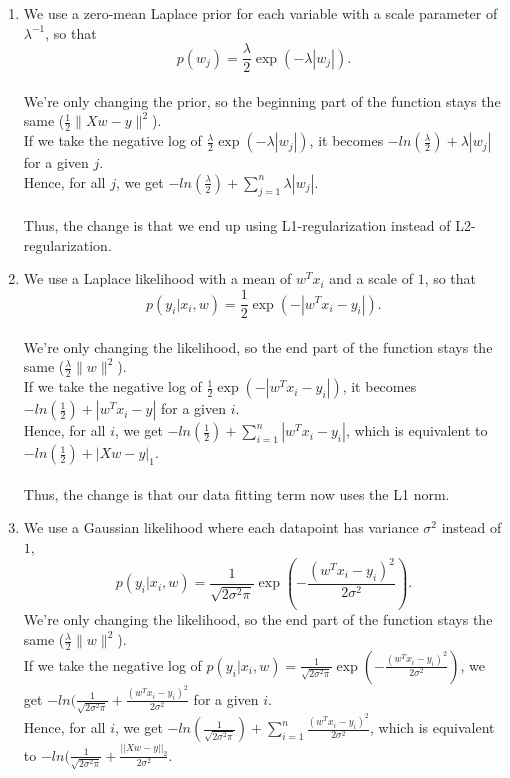 \documentclass{article}
\def\gre#1{{\color{gre}#1}}
\def\norm#1{\|#1\|}
\def\enum#1{\begin{enumerate}#1\end{enumerate}}
\begin{document}
\enum{
\item We use a zero-mean Laplace prior for each variable with a scale parameter of $\lambda^{-1}$, so that
\[
p(w_j) = \frac{\lambda}{2}\exp(-\lambda|w_j|).
\]\\
\gre{
We're only changing the prior, so the beginning part of the function stays the same ($\frac{1}{2}\norm{Xw - y}^2$).
\\
If we take the negative log of $\frac{\lambda}{2}\exp(-\lambda|w_j|)$, it becomes $-ln(\frac{\lambda}{2}) + \lambda|w_j|$ for a given $j$.
\\
Hence, for all $j$, we get $-ln(\frac{\lambda}{2}) + \sum_{j=1}^{n}λ|w_j|$.
\\\\
Thus, the change is that we end up using L1-regularization instead of L2-regularization.
}
\item We use a Laplace likelihood with a mean of $w^Tx_i$ and a scale of $1$, so that
\[
p(y_i | x_i, w) = \frac 1 2 \exp(-|w^Tx_i - y_i|).
\]\\
\gre{
We're only changing the likelihood, so the end part of the function stays the same ($\frac \lambda 2 \norm{w}^2$).
\\
If we take the negative log of $\frac 1 2 \exp(-|w^Tx_i - y_i|)$, it becomes $-ln(\frac{1}{2}) + |w^Tx_i - y|$ for a given $i$.
\\
Hence, for all $i$, we get $-ln(\frac{1}{2}) + \sum_{i=1}^{n}|w^Tx_i - y_i|$, which is equivalent to $-ln(\frac{1}{2}) + |Xw - y|_1$.
\\\\
Thus, the change is that our data fitting term now uses the L1 norm.
}
\item We use a Gaussian likelihood where each datapoint has variance $\sigma^2$ instead of $1$,
\[
p(y_i | x_i,w) = \frac{1}{\sqrt{2\sigma^2\pi}}\exp\left(-\frac{(w^Tx_i - y_i)^2}{2\sigma^2}\right).
\]
\gre{
We're only changing the likelihood, so the end part of the function stays the same ($\frac \lambda 2 \norm{w}^2$).
\\
If we take the negative log of $p(y_i | x_i,w) = \frac{1}{\sqrt{2\sigma^2\pi}}\exp\left(-\frac{(w^Tx_i - y_i)^2}{2\sigma^2}\right)$, we get $-ln(\frac{1}{\sqrt{2\sigma^2\pi}} + \frac{(w^Tx_i - y_i)^2}{2\sigma^2}$ for a given $i$.
\\
Hence, for all $i$, we get $-ln(\frac{1}{\sqrt{2\sigma^2\pi}}) + \sum_{i=1}^{n}\frac{(w^Tx_i - y_i)^2}{2\sigma^2}$, which is equivalent to $-ln(\frac{1}{\sqrt{2\sigma^2\pi}} + \frac{||Xw-y||_2}{2\sigma^2}$.
\\\\
}}
\end{document}
